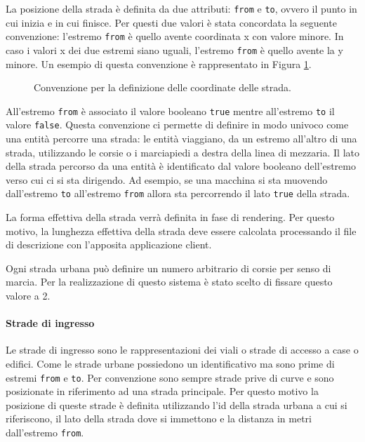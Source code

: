  La posizione della strada è definita da due attributi: \texttt{from} e
 \texttt{to}, ovvero il punto in cui inizia e in cui finisce.
Per questi due valori è stata concordata la seguente convenzione: l'estremo
\texttt{from} è quello avente coordinata x con valore minore. In caso i valori
x dei due estremi siano uguali, l'estremo \texttt{from} è quello avente la y
minore.
Un esempio di questa convenzione è rappresentato in Figura
\ref{fig:polaritastrade}.

\begin{figure}[H] %
\caption{Convenzione per la definizione delle coordinate delle strada.}
\label{fig:polaritastrade}
\end{figure}

All'estremo \texttt{from} è associato il valore booleano \texttt{true} mentre
all'estremo \texttt{to} il valore \texttt{false}.
Questa convenzione ci permette di definire in modo univoco come una entità
percorre una strada: le entità viaggiano, da un estremo all'altro di una strada,
utilizzando le corsie o i marciapiedi a destra della linea di mezzaria. Il lato
della strada percorso da una entità è identificato dal valore booleano
dell'estremo verso cui ci si sta dirigendo. Ad esempio, se una macchina si sta
muovendo dall'estremo \texttt{to} all'estremo \texttt{from} allora sta
percorrendo il lato \texttt{true} della strada.

La forma effettiva della strada verrà definita in fase di rendering. Per questo
motivo, la lunghezza effettiva della strada deve essere calcolata processando il
file di descrizione con l'apposita applicazione client.

Ogni strada urbana può definire un numero arbitrario di corsie per senso di
marcia.
Per la realizzazione di questo sistema è stato scelto di fissare questo valore a 2.

\paragraph*{Strade di ingresso}
Le strade di ingresso sono le rappresentazioni dei viali o strade di accesso a
case o edifici. Come le strade urbane possiedono un identificativo ma sono
prime di estremi \texttt{from} e \texttt{to}.
Per convenzione sono sempre strade prive di curve e sono posizionate in
riferimento ad una strada principale. Per questo motivo la posizione di queste
strade è definita utilizzando l'id della strada urbana a cui si riferiscono, il
lato della strada dove si immettono e la distanza in metri dall'estremo
\texttt{from}.

